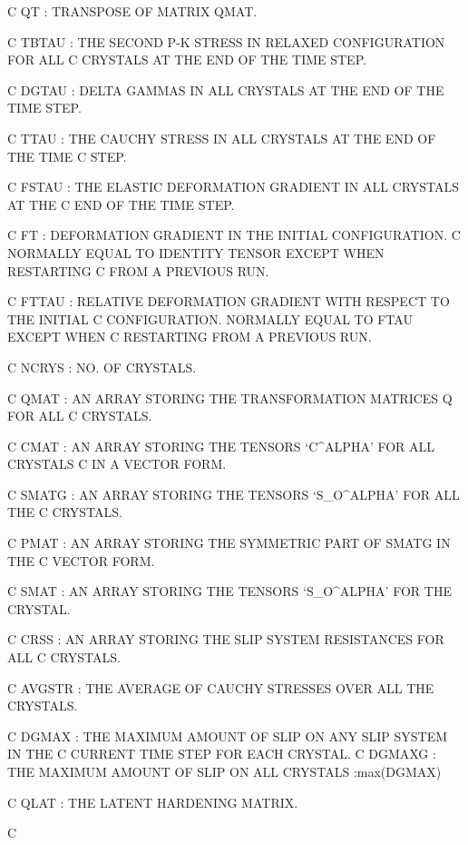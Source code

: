 C   QT          : TRANSPOSE OF MATRIX QMAT.

C   TBTAU       : THE SECOND P-K STRESS IN RELAXED CONFIGURATION FOR ALL 
C                 CRYSTALS AT THE END OF THE TIME STEP.


C   DGTAU       : DELTA GAMMAS IN ALL CRYSTALS AT THE END OF THE TIME STEP.

C   TTAU        : THE CAUCHY STRESS IN ALL CRYSTALS AT THE END OF THE TIME 
C                 STEP.

C   FSTAU       : THE ELASTIC DEFORMATION GRADIENT IN ALL CRYSTALS AT THE 
C                 END OF THE TIME STEP.


C   FT          : DEFORMATION GRADIENT IN THE INITIAL CONFIGURATION. 
C                 NORMALLY EQUAL TO IDENTITY TENSOR EXCEPT WHEN RESTARTING
C                 FROM A PREVIOUS RUN.

C   FTTAU       : RELATIVE DEFORMATION GRADIENT WITH RESPECT TO THE INITIAL
C                 CONFIGURATION. NORMALLY EQUAL TO FTAU EXCEPT WHEN 
C                 RESTARTING FROM A PREVIOUS RUN.

C   NCRYS       : NO. OF CRYSTALS.

C   QMAT        : AN ARRAY STORING THE TRANSFORMATION MATRICES Q FOR ALL
C                 CRYSTALS.

C   CMAT        : AN ARRAY STORING THE TENSORS `C^ALPHA' FOR ALL CRYSTALS 
C                 IN A VECTOR FORM.

C   SMATG       : AN ARRAY STORING THE TENSORS `S_O^ALPHA' FOR ALL THE
C                 CRYSTALS.

C   PMAT        : AN ARRAY STORING THE SYMMETRIC PART OF SMATG IN THE 
C                 VECTOR FORM. 

C   SMAT        : AN ARRAY STORING THE TENSORS `S_O^ALPHA' FOR THE CRYSTAL. 

C   CRSS        : AN ARRAY STORING THE SLIP SYSTEM RESISTANCES FOR ALL
C                 CRYSTALS.

C   AVGSTR      : THE AVERAGE OF CAUCHY STRESSES OVER ALL THE CRYSTALS.

C   DGMAX       : THE MAXIMUM AMOUNT OF SLIP ON ANY SLIP SYSTEM IN THE
C                 CURRENT TIME STEP FOR EACH CRYSTAL.
C   DGMAXG      : THE MAXIMUM AMOUNT OF SLIP ON ALL CRYSTALS :max(DGMAX)

C   QLAT        : THE LATENT HARDENING MATRIX.

C $$$$$$$$$$$$$$$$$$$$$$$$$$$$$$$$$$$$$$$$$$$$$$$$$$$$$$$$$$$$$$$$$$$$$$$$

